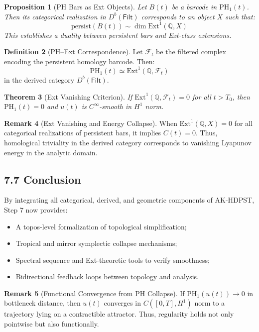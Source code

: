 \documentclass[11pt]{article}
\newtheorem{theorem}{Theorem}[section]
\newtheorem{proposition}[theorem]{Proposition}
\theoremstyle{definition}
\newtheorem{definition}[theorem]{Definition}
\newtheorem{remark}[theorem]{Remark}
\begin{document}
\begin{proposition}[PH Bars as Ext Objects]
Let $B(t)$ be a barcode in $\mathrm{PH}_1(t)$. Then its categorical realization in $D^b(\mathsf{Filt})$ corresponds to an object $X$ such that:
\[
\text{persist}(B(t)) \sim \dim \mathrm{Ext}^1(\mathbb{Q}, X)
\]
This establishes a duality between persistent bars and Ext-class extensions.
\end{proposition}

\begin{definition}[PH--Ext Correspondence]
Let $\mathcal{F}_t$ be the filtered complex encoding the persistent homology barcode. Then:
\[
\mathrm{PH}_1(t) \simeq \mathrm{Ext}^1(\mathbb{Q}, \mathcal{F}_t)
\]
in the derived category $D^b(\mathsf{Filt})$.
\end{definition}

\begin{theorem}[Ext Vanishing Criterion]
If $\mathrm{Ext}^1(\mathbb{Q}, \mathcal{F}_t) = 0$ for all $t > T_0$, then $\mathrm{PH}_1(t) = 0$ and $u(t)$ is $C^\infty$-smooth in $H^1$ norm.
\end{theorem}

\begin{remark}[Ext Vanishing and Energy Collapse]
When $\mathrm{Ext}^1(\mathbb{Q}, X) = 0$ for all categorical realizations of persistent bars, it implies $C(t) = 0$. Thus, homological triviality in the derived category corresponds to vanishing Lyapunov energy in the analytic domain.
\end{remark}

\subsection*{7.7 Conclusion}

By integrating all categorical, derived, and geometric components of AK-HDPST, Step 7 now provides:
\begin{itemize}
  \item A topos-level formalization of topological simplification;
  \item Tropical and mirror symplectic collapse mechanisms;
  \item Spectral sequence and Ext-theoretic tools to verify smoothness;
  \item Bidirectional feedback loops between topology and analysis.
\end{itemize}

\begin{remark}[Functional Convergence from PH Collapse]
If $\mathrm{PH}_1(u(t)) \to 0$ in bottleneck distance, then $u(t)$ converges in $C([0,T], H^1)$ norm to a trajectory lying on a contractible attractor. Thus, regularity holds not only pointwise but also functionally.
\end{remark}
\end{document}
